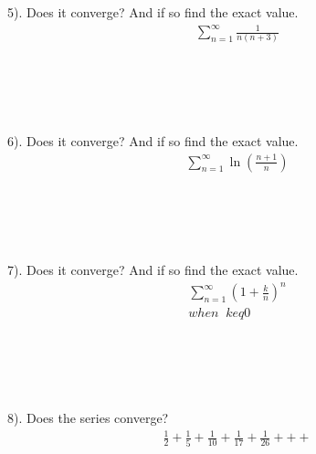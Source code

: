 \documentclass[fleqn]{article}
\begin{document}
5).  Does it converge?  And if so find the exact value.\\

\begin{align*}
\sum_{n=1}^{\infty}\frac{1}{n(n+3)}
\end{align*}


\begin{verbatim}





\end{verbatim}

6).  Does it converge?  And if so find the exact value.\\

\begin{align*}
\sum_{n=1}^{\infty} \ln(\frac{n+1}{n})
\end{align*}


\begin{verbatim}





\end{verbatim}

7).  Does it converge?  And if so find the exact value.\\

\begin{align*}
\sum_{n=1}^{\infty} \left(1+\frac{k}{n}\right)^{n}\\
when \;\; k 
eq 0
\end{align*}


\begin{verbatim}





\end{verbatim}

8).  Does the series converge?\\

\begin{align*}
\frac{1}{2} + \frac{1}{5} + \frac{1}{10} + \frac{1}{17} + \frac{1}{26} + + +\\
\end{align*}

\begin{verbatim}





\end{verbatim}
\end{document}
